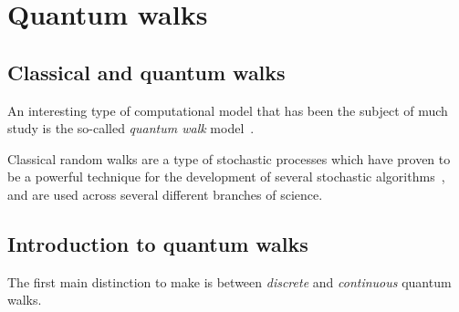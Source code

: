 \section{Quantum walks}

\subsection{Classical and quantum walks}

An interesting type of computational model that has been the subject of much study is the so-called \textit{quantum walk} model~\cite{aharonov2000quantum,venegas-andraca2012quantum}.

Classical random walks are a type of stochastic processes which have proven to be a powerful technique for the development of several stochastic algorithms~\cite{motwani1995randomized,schoning1999probabilistic}, and are used across several different branches of science.

\subsection{Introduction to quantum walks}
The first main distinction to make is between \textit{discrete} and \textit{continuous} quantum walks.

